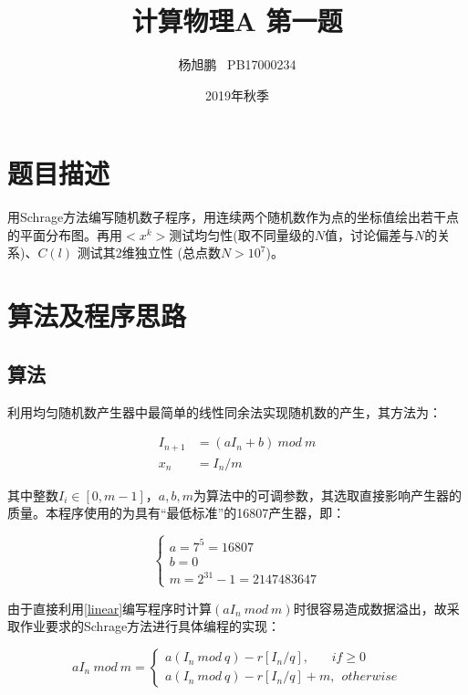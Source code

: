 \documentclass[a4paper,11pt]{article}
\author{ 杨旭鹏  \  PB17000234}
\date{2019年秋季}
\title{计算物理A 第一题}
\begin{document}
\maketitle

\section{题目描述}
用Schrage方法编写随机数子程序，用连续两个随机数作为点的坐标值绘出若干点的平面分布图。再用$<x^{k}>$测试均匀性(取不同量级的$N$值，讨论偏差与$N$的关系)、$C(l)$ 测试其2维独立性 (总点数$N>10^{7}$)。

\section{算法及程序思路}
\subsection{算法}
利用均匀随机数产生器中最简单的线性同余法实现随机数的产生，其方法为：

\begin{equation}
\begin{aligned}
	I_{n+1} &= (aI_{n} + b) \ mod \ m \\
	x_{n} &= I_{n}/m
\end{aligned}
\label{linear}	
\end{equation}

其中整数$I_{i} \in [0,m-1]$，$a,b,m$为算法中的可调参数，其选取直接影响产生器的质量。本程序使用的为具有“最低标准”的16807产生器，即：

\begin{equation}
\left\{
\begin{array}{l}
	a = 7^{5} = 16807 \\
	b = 0 \\
	m = 2^{31}-1 = 2147483647
\end{array}
\right.
\end{equation}

由于直接利用\ref{linear}编写程序时计算$(aI_{n} \ mod \ m )$时很容易造成数据溢出，故采取作业要求的Schrage方法进行具体编程的实现：

\begin{equation}
	aI_{n} \ mod \ m = \left\{
	\begin{array}{l}
		a(I_{n}\ mod \ q) - r[I_{n}/q],\ \ \ \ \ \ \ \ if \geq 0 \\
		a(I_{n}\ mod \ q) - r[I_{n}/q] + m,\ \ otherwise	
			\end{array}
	\right.
\end{equation}
\end{document}
